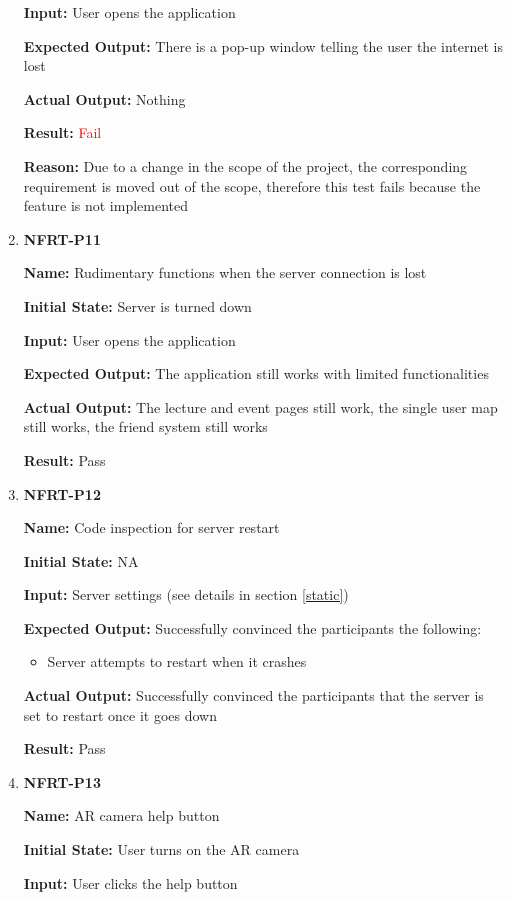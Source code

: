 \documentclass[12pt, titlepage]{article}
\begin{document}
\begin{enumerate}
\textbf{Input:} User opens the application
					
\textbf{Expected Output:} There is a pop-up window telling the user the internet is lost

\textbf{Actual Output:} Nothing

\textbf{Result:} \textcolor{red}{Fail}

\textbf{Reason:} Due to a change in the scope of the project, the corresponding requirement is moved out of the scope, therefore this test fails because the feature is not implemented

\item \textbf{NFRT-P11}

\textbf{Name:} Rudimentary functions when the server connection is lost

\textbf{Initial State:} Server is turned down
					
\textbf{Input:} User opens the application
					
\textbf{Expected Output:} The application still works with limited functionalities

\textbf{Actual Output:} The lecture and event pages still work, the single user map still works, the friend system still works

\textbf{Result:} Pass

\item \textbf{NFRT-P12}

\textbf{Name:} Code inspection for server restart

\textbf{Initial State:} NA

\textbf{Input:} Server settings (see details in section \ref{static})
					
\textbf{Expected Output:} Successfully convinced the participants the following:
\begin{itemize}
\item Server attempts to restart when it crashes
\end{itemize}

\textbf{Actual Output:} Successfully convinced the participants that the server is set to restart once it goes down

\textbf{Result:} Pass

\item \textbf{NFRT-P13}

\textbf{Name:} AR camera help button

\textbf{Initial State:} User turns on the AR camera

\textbf{Input:} User clicks the help button
					

\end{enumerate}
\end{document}
